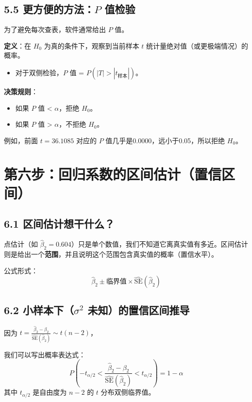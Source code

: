 \documentclass[12pt,a4paper]{ctexart}
\begin{document}
\subsection*{5.5 更方便的方法：\(P\) 值检验}
为了避免每次查表，软件通常给出 \(P\) 值。

\textbf{定义}：在 \(H_0\) 为真的条件下，观察到当前样本 \(t\) 统计量绝对值（或更极端情况）的概率。
\begin{itemize}
    \item 对于双侧检验，\(P\) 值 = \(P(|T| > |t_{\text{样本}}|)\)。
\end{itemize}

\textbf{决策规则}：
\begin{itemize}
    \item 如果 \(P\) 值 < \(\alpha\)，拒绝 \(H_0\)。
    \item 如果 \(P\) 值 > \(\alpha\)，不拒绝 \(H_0\)。
\end{itemize}

例如，前面 \(t=36.1085\) 对应的 \(P\) 值几乎是0.0000，远小于0.05，所以拒绝 \(H_0\)。

\section*{第六步：回归系数的区间估计（置信区间）}

\subsection*{6.1 区间估计想干什么？}
点估计（如 \(\hat{\beta}_2=0.604\)）只是单个数值，我们不知道它离真实值有多近。区间估计则是给出一个\textbf{范围}，并且说明这个范围包含真实值的概率（置信水平）。

公式形式：
\[
\hat{\beta}_2 \pm \text{临界值} \times \widehat{\text{SE}}(\hat{\beta}_2)
\]

\subsection*{6.2 小样本下（\(\sigma^2\) 未知）的置信区间推导}
因为 \(t = \frac{\hat{\beta}_2 - \beta_2}{\widehat{\text{SE}}(\hat{\beta}_2)} \sim t(n-2)\)，

我们可以写出概率表达式：
\[
P\left( -t_{\alpha/2} < \frac{\hat{\beta}_2 - \beta_2}{\widehat{\text{SE}}(\hat{\beta}_2)} < t_{\alpha/2} \right) = 1 - \alpha
\]
其中 \(t_{\alpha/2}\) 是自由度为 \(n-2\) 的 \(t\) 分布双侧临界值。
\end{document}
